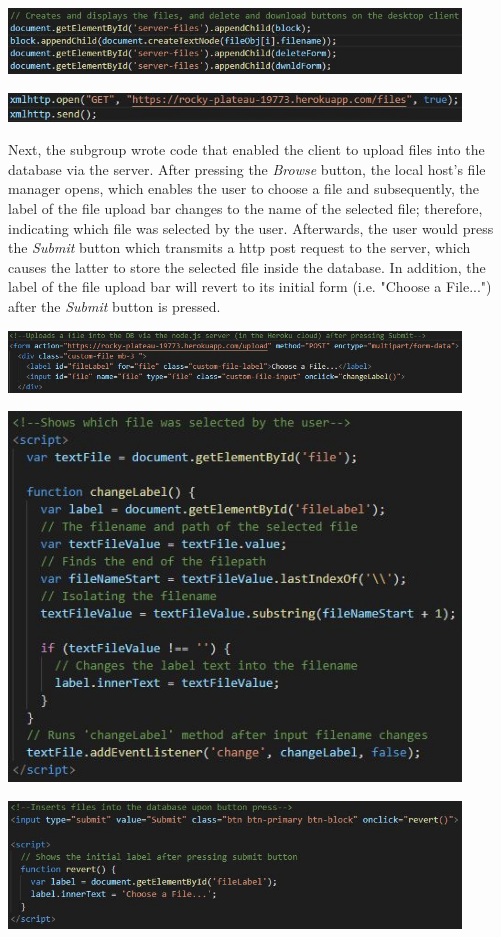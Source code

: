 \documentclass{article}
\begin{document}
\includegraphics[width=12cm]{display2}

\includegraphics[width=12cm]{display3}

Next, the subgroup wrote code that enabled the client to upload files into the database via the server. After pressing the \textit{Browse} button, the local host's file manager opens, which enables the user to choose a file and subsequently, the label of the file upload bar changes to the name of the selected file; therefore, indicating which file was selected by the user. Afterwards, the user would press the \textit{Submit} button which transmits a http post request to the server, which causes the latter to store the selected file inside the database. In addition, the label of the file upload bar will revert to its initial form (i.e. "Choose a File...") after the \textit{Submit} button is pressed. 

\includegraphics[width=12cm]{upload}

\includegraphics[width=12cm]{upload2}

\includegraphics[width=12cm]{upload3}
\end{document}
